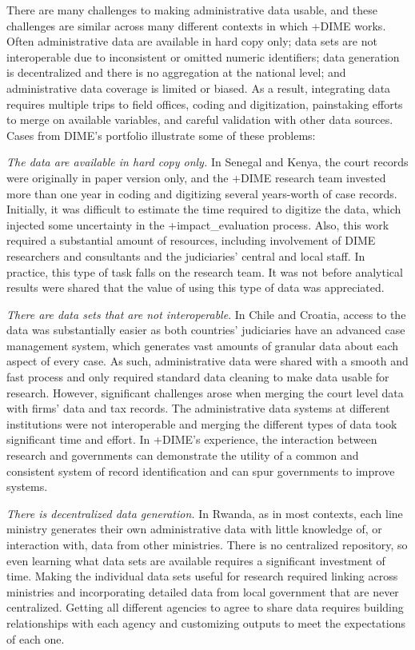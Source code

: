 \documentclass[
]{WileySix}
\begin{document}
There are many challenges to making administrative data usable, and these challenges are similar across many different contexts in which +DIME\textbar{} works. Often administrative data are available in hard copy only; data sets are not interoperable due to inconsistent or omitted numeric identifiers; data generation is decentralized and there is no aggregation at the national level; and administrative data coverage is limited or biased. As a result, integrating data requires multiple trips to field offices, coding and digitization, painstaking efforts to merge on available variables, and careful validation with other data sources. Cases from DIME's portfolio illustrate some of these problems:

\emph{The data are available in hard copy only.} In Senegal and Kenya, the court records were originally in paper version only, and the +DIME\textbar{} research team invested more than one year in coding and digitizing several years-worth of case records. Initially, it was difficult to estimate the time required to digitize the data, which injected some uncertainty in the +impact\_evaluation\textbar{} process. Also, this work required a substantial amount of resources, including involvement of DIME researchers and consultants and the judiciaries' central and local staff. In practice, this type of task falls on the research team. It was not before analytical results were shared that the value of using this type of data was appreciated.

\emph{There are data sets that are not interoperable}. In Chile and Croatia, access to the data was substantially easier as both countries' judiciaries have an advanced case management system, which generates vast amounts of granular data about each aspect of every case. As such, administrative data were shared with a smooth and fast process and only required standard data cleaning to make data usable for research. However, significant challenges arose when merging the court level data with firms' data and tax records. The administrative data systems at different institutions were not interoperable and merging the different types of data took significant time and effort. In +DIME\textbar's experience, the interaction between research and governments can demonstrate the utility of a common and consistent system of record identification and can spur governments to improve systems.

\emph{There is decentralized data generation.} In Rwanda, as in most contexts, each line ministry generates their own administrative data with little knowledge of, or interaction with, data from other ministries. There is no centralized repository, so even learning what data sets are available requires a significant investment of time. Making the individual data sets useful for research required linking across ministries and incorporating detailed data from local government that are never centralized. Getting all different agencies to agree to share data requires building relationships with each agency and customizing outputs to meet the expectations of each one.
\end{document}
